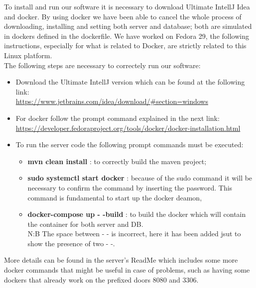 To install and run our software it is necessary to download Ultimate IntellJ Idea and docker. By using docker we have been able to cancel the whole process of downloading, installing and setting both server and database; both are simulated in dockers defined in the dockerfile. We have worked on Fedora 29, the following instructions, especially for what is related to Docker, are strictly related to this Linux platform.\\
The following steps are necessary to correctely run our software:
\begin{itemize}
	\item Download the Ultimate IntellJ version which can be found at the following link:\\
 		\url{https://www.jetbrains.com/idea/download/#section=windows}

	\item For docker follow the prompt command explained in the next link:\\
		\url{https://developer.fedoraproject.org/tools/docker/docker-installation.html}\\

	\item To run the server code the following prompt commands must be executed:\\
		\begin{itemize}
			\item \textbf{ mvn clean install} : to correctly build the maven project;
			\item \textbf{ sudo systemctl start docker} : because of the sudo command it will be necessary to confirm the 					command by inserting the password. This command is fundamental to start up the docker deamon,	
			\item \textbf{ docker-compose up - -build} : to build the docker which will contain the container for both server 					and DB.\\N:B The space between - - is incorrect, here it has been added jsut to show the presence of two - -.
		\end{itemize}
\end{itemize}
More details can be found in the server's ReadMe which includes some more docker commands that might be useful in case of problems, such as having some dockers that already work on the prefixed doors 8080 and 3306.
